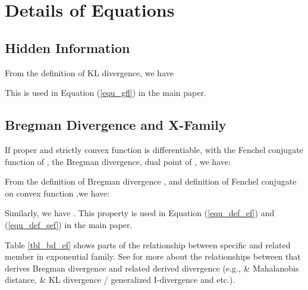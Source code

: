 \documentclass{article}
\begin{document}
\section{Details of Equations}
\label{appdx_sec_doe}
\subsection{Hidden Information}

From the definition of KL divergence, we have 

This is used in Equation (\ref{equ_gfl}) in the main paper.

\subsection{Bregman Divergence and X-Family}

If proper and strictly convex function  is differentiable, with  the Fenchel conjugate function of ,  the Bregman divergence,  dual point of , we have:


From the definition of Bregman divergence ,  and definition of  Fenchel conjugate on convex function  ,we have:

Similarly, we have . This property is used in Equation (\ref{equ_def_ef}) and (\ref{equ_def_sef}) in the main paper.

\begin{table}[ht]
    \centering
    \caption{Bregman divergence and exponential family. (note )}
    \label{tbl_bd_ef}
\end{table}

Table \ref{tbl_bd_ef} shows parts of the relationship between specific  and related member in exponential family. See \cite{banerjee2005clustering} for more about the relationships between  that derives Bregman divergence  and related derived divergence (e.g.,  \& Mahalanobis distance,  \& KL divergence / generalized I-divergence and etc.).
\end{document}
